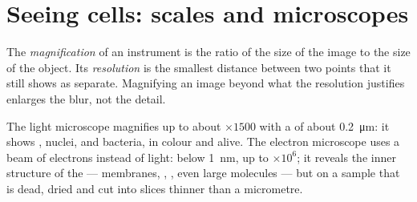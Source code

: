 \section{Seeing cells: scales and microscopes}

\begin{definition}\label{def:g10:cells-common-unit:magnification}
The \emph{magnification} of an instrument is the
ratio of the size of the image to the size of the object. Its
\emph{resolution} is the smallest distance between
two points that it still shows as separate. Magnifying an image beyond
what the resolution justifies enlarges the blur, not the detail.
\end{definition}

\begin{proposition}\label{prop:g10:cells-common-unit:microscopes}
The light microscope magnifies up to about $\times 1500$ with a
 of about \qty{0.2}{\micro m}: it shows , nuclei,
 and bacteria, in colour and alive. The electron microscope
uses a beam of electrons instead of light:  below
\qty{1}{nm},  up to $\times 10^6$; it reveals the inner
structure of the  --- membranes, , , even
large molecules --- but on a sample that is dead, dried and cut into
slices thinner than a micrometre.
\end{proposition}
\admitted

